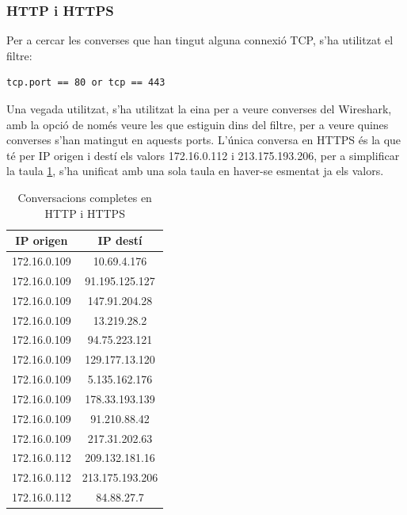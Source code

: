 \documentclass{article}
\begin{document}
\subsubsection{HTTP i HTTPS}
Per a cercar les converses que han tingut alguna connexió TCP, s'ha utilitzat
el filtre:
\begin{verbatim}
tcp.port == 80 or tcp == 443
\end{verbatim}
Una vegada utilitzat, s'ha utilitzat la eina per a veure converses del
Wireshark, amb la opció de només veure les que estiguin dins del filtre,
per a veure quines converses s'han matingut en aquests ports. L'única conversa
en HTTPS és la que té per IP origen i destí els valors 172.16.0.112 i 
213.175.193.206, per a simplificar la taula 
\ref{tcp:http}, s'ha unificat amb una sola taula
en haver-se esmentat ja els valors.
\begin{table}[!h]
\centering
\begin{tabular}{|c|c|}
\hline
IP origen &IP destí\\
\hline
172.16.0.109 &10.69.4.176\\
\hline
172.16.0.109 &91.195.125.127\\
\hline
172.16.0.109 &147.91.204.28\\
\hline
172.16.0.109 &13.219.28.2\\
\hline
172.16.0.109 &94.75.223.121\\
\hline
172.16.0.109 &129.177.13.120\\
\hline
172.16.0.109 &5.135.162.176\\
\hline
172.16.0.109 &178.33.193.139\\
\hline
172.16.0.109 &91.210.88.42\\
\hline
172.16.0.109 &217.31.202.63\\
\hline
172.16.0.112 &209.132.181.16\\
\hline
172.16.0.112 &213.175.193.206\\
\hline
172.16.0.112 &84.88.27.7\\
\hline
\end{tabular}
\caption{Conversacions completes en HTTP i HTTPS}
\label{tcp:http}
\end{table}
\end{document}
